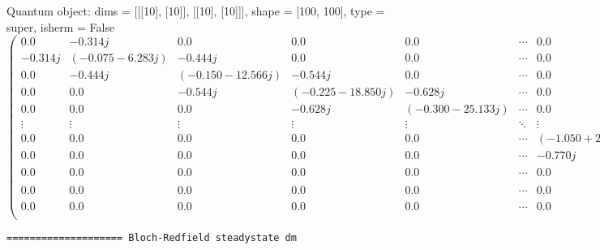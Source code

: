 \documentclass{article}
\begin{document}
    Quantum object: dims = [[[10], [10]], [[10], [10]]], shape = [100, 100], type = super, isherm = False\begin{equation*}\begin{pmatrix}0.0 & -0.314j & 0.0 & 0.0 & 0.0 & \cdots & 0.0 & 0.0 & 0.0 & 0.0 & 0.0\\-0.314j & (-0.075-6.283j) & -0.444j & 0.0 & 0.0 & \cdots & 0.0 & 0.0 & 0.0 & 0.0 & 0.0\\0.0 & -0.444j & (-0.150-12.566j) & -0.544j & 0.0 & \cdots & 0.0 & 0.0 & 0.0 & 0.0 & 0.0\\0.0 & 0.0 & -0.544j & (-0.225-18.850j) & -0.628j & \cdots & 0.0 & 0.0 & 0.0 & 0.0 & 0.0\\0.0 & 0.0 & 0.0 & -0.628j & (-0.300-25.133j) & \cdots & 0.0 & 0.0 & 0.0 & 0.0 & 0.0\\\vdots & \vdots & \vdots & \vdots & \vdots & \ddots & \vdots & \vdots & \vdots & \vdots & \vdots\\0.0 & 0.0 & 0.0 & 0.0 & 0.0 & \cdots & (-1.050+25.133j) & -0.770j & 0.0 & 0.0 & 0.0\\0.0 & 0.0 & 0.0 & 0.0 & 0.0 & \cdots & -0.770j & (-1.125+18.850j) & -0.831j & 0.0 & 0.0\\0.0 & 0.0 & 0.0 & 0.0 & 0.0 & \cdots & 0.0 & -0.831j & (-1.200+12.566j) & -0.889j & 0.0\\0.0 & 0.0 & 0.0 & 0.0 & 0.0 & \cdots & 0.0 & 0.0 & -0.889j & (-1.275+6.283j) & -0.942j\\0.0 & 0.0 & 0.0 & 0.0 & 0.0 & \cdots & 0.0 & 0.0 & 0.0 & -0.942j & -1.350\\\end{pmatrix}\end{equation*}

    
    \begin{Verbatim}[commandchars=\\\{\}]
==================== Bloch-Redfield steadystate dm
    \end{Verbatim}
\end{document}
